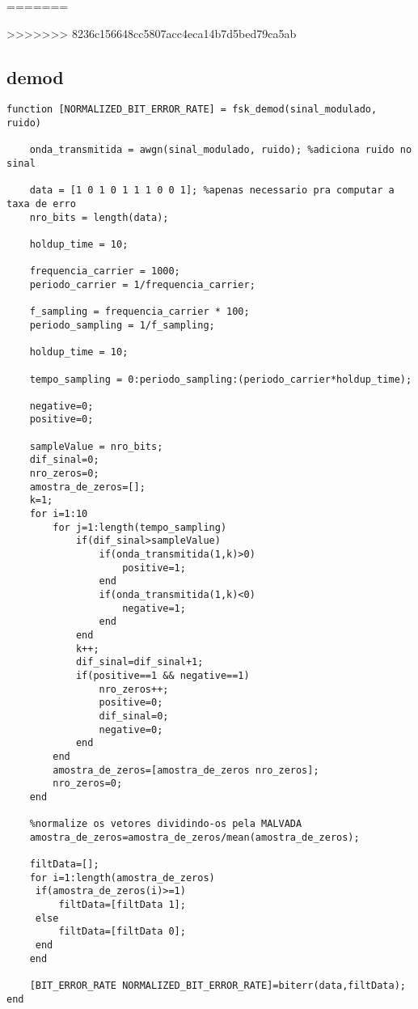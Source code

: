 \documentclass[11pt,a4paper]{report}
\begin{document}
	
=======

	
>>>>>>> 8236c156648cc5807acc4eca14b7d5bed79ca5ab
	\subsection{demod}
	
	\begin{verbatim}
function [NORMALIZED_BIT_ERROR_RATE] = fsk_demod(sinal_modulado, ruido)

    onda_transmitida = awgn(sinal_modulado, ruido); %adiciona ruido no sinal

    data = [1 0 1 0 1 1 1 0 0 1]; %apenas necessario pra computar a taxa de erro
    nro_bits = length(data);

    holdup_time = 10;

    frequencia_carrier = 1000; 
    periodo_carrier = 1/frequencia_carrier;

    f_sampling = frequencia_carrier * 100;
    periodo_sampling = 1/f_sampling;

    holdup_time = 10;
    
    tempo_sampling = 0:periodo_sampling:(periodo_carrier*holdup_time);

    negative=0;
    positive=0;

    sampleValue = nro_bits;
    dif_sinal=0;
    nro_zeros=0;
    amostra_de_zeros=[];
    k=1;
    for i=1:10
        for j=1:length(tempo_sampling)
            if(dif_sinal>sampleValue)
                if(onda_transmitida(1,k)>0)
                    positive=1;    
                end
                if(onda_transmitida(1,k)<0)
                    negative=1;
                end
            end
            k++;
            dif_sinal=dif_sinal+1;
            if(positive==1 && negative==1)
                nro_zeros++;
                positive=0;
                dif_sinal=0;
                negative=0;
            end
        end
        amostra_de_zeros=[amostra_de_zeros nro_zeros];
        nro_zeros=0;     
    end

    %normalize os vetores dividindo-os pela MALVADA
    amostra_de_zeros=amostra_de_zeros/mean(amostra_de_zeros);

    filtData=[];
    for i=1:length(amostra_de_zeros)
     if(amostra_de_zeros(i)>=1)
         filtData=[filtData 1];
     else
         filtData=[filtData 0];
     end
    end

    [BIT_ERROR_RATE NORMALIZED_BIT_ERROR_RATE]=biterr(data,filtData);
end
	
	\end{verbatim}
	
\end{document}
